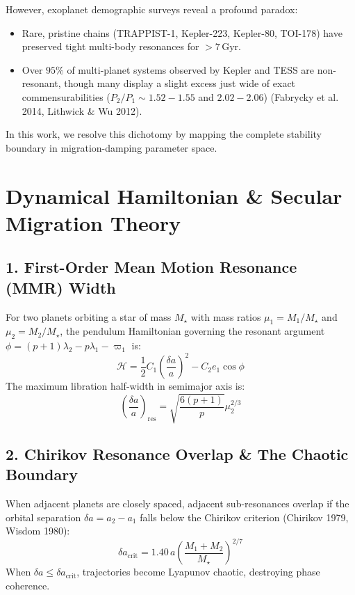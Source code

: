 \documentclass[11pt,a4paper]{article}
\begin{document}
However, exoplanet demographic surveys reveal a profound paradox:
\begin{itemize}
    \item Rare, pristine chains (TRAPPIST-1, Kepler-223, Kepler-80, TOI-178) have preserved tight multi-body resonances for $> 7\,\mathrm{Gyr}$.
    \item Over $95\%$ of multi-planet systems observed by Kepler and TESS are non-resonant, though many display a slight excess just wide of exact commensurabilities ($P_2/P_1 \sim 1.52-1.55$ and $2.02-2.06$) (Fabrycky et al. 2014, Lithwick \& Wu 2012).
\end{itemize}
In this work, we resolve this dichotomy by mapping the complete stability boundary in migration-damping parameter space.

\section{Dynamical Hamiltonian \& Secular Migration Theory}

\subsection{1. First-Order Mean Motion Resonance (MMR) Width}
For two planets orbiting a star of mass $M_\star$ with mass ratios $\mu_1 = M_1 / M_\star$ and $\mu_2 = M_2 / M_\star$, the pendulum Hamiltonian governing the resonant argument $\phi = (p+1)\lambda_2 - p\lambda_1 - \varpi_1$ is:
\begin{equation}
\mathcal{H} = \frac{1}{2} C_1 \left( \frac{\delta a}{a} \right)^2 - C_2 e_1 \cos\phi
\end{equation}
The maximum libration half-width in semimajor axis is:
\begin{equation}
\left( \frac{\delta a}{a} \right)_{\text{res}} = \sqrt{ \frac{6 (p+1)}{p} } \mu_2^{2/3}
\end{equation}

\subsection{2. Chirikov Resonance Overlap \& The Chaotic Boundary}
When adjacent planets are closely spaced, adjacent sub-resonances overlap if the orbital separation $\delta a = a_2 - a_1$ falls below the Chirikov criterion (Chirikov 1979, Wisdom 1980):
\begin{equation}
\delta a_{\text{crit}} = 1.40 \, a \left( \frac{M_1 + M_2}{M_\star} \right)^{2/7}
\end{equation}
When $\delta a \le \delta a_{\text{crit}}$, trajectories become Lyapunov chaotic, destroying phase coherence.
\end{document}
